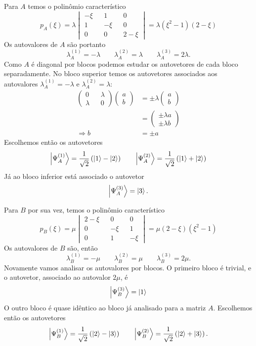 \documentclass[a4paper, 12pt, notitlepage]{article}
\begin{document}
\begin{enumerate}
\begin{enumerate}[(A)]
  Para $A$ temos o polinômio característico
  \[ p_A(\xi) = \lambda\begin{vmatrix}
    -\xi && 1 && 0 \\ 1 && -\xi && 0 \\ 0 && 0 && 2 - \xi
  \end{vmatrix} = \lambda(\xi^2 - 1)(2 - \xi) \]
  Os autovalores de $A$ são portanto 
  \[\lambda_A^{(1)} = -\lambda \qquad \lambda_A^{(2)} = \lambda \qquad \lambda_A^{(3)} = 2\lambda.\]
  Como $A$ é diagonal por blocos podemos estudar os autovetores de cada bloco separadamente. No bloco superior temos os autovetores associados aos autovalores $\lambda_A^{(1)} = -\lambda$ e $\lambda_A^{(2)} = \lambda$:
  \begin{align*}
  \begin{pmatrix}0 && \lambda \\ \lambda && 0 \end{pmatrix}
  \begin{pmatrix}a \\ b \end{pmatrix} &= \pm \lambda \begin{pmatrix} a \\ b \end{pmatrix} \\
  &= \begin{pmatrix}
  \pm\lambda a \\ \pm\lambda b
  \end{pmatrix} \\
  \Rightarrow b &= \pm a
  \end{align*}
  Escolhemos então os autovetores
  \[ \ket{\Psi_A^{(1)}} = \frac{1}{\sqrt{2}}\left(\ket{1} - \ket{2}\right) \qquad \ket{\Psi_A^{(2)}} = \frac{1}{\sqrt{2}}\left(\ket{1} + \ket{2}\right) \]
  Já ao bloco inferior está associado o autovetor
  \[ \ket{\Psi_A^{(3)}} = \ket{3}. \]
  
  Para $B$ por sua vez, temos o polinômio característico
  \[
  p_B(\xi) = \mu\begin{vmatrix}
  2 - \xi && 0 && 0 \\
  0 && -\xi && 1 \\
  0 && 1 && -\xi
  \end{vmatrix} = \mu(2-\xi)(\xi^2 - 1)
  \]
  Os autovalores de $B$ são, então
  \[ \lambda_B^{(1)} = -\mu \qquad \lambda_B^{(2)} = \mu \qquad \lambda_B^{(3)} = 2\mu. \]
  Novamente vamos analisar os autovalores por blocos. O primeiro bloco é trivial, e o autovetor, associado ao autovalor $2\mu$, é
  \[ \ket{\Psi_B^{(3)}} = \ket{1} \]
  O outro bloco é quase idêntico ao bloco já analisado para a matriz $A$. Escolhemos então os autovetores
  \[ \ket{\Psi_B^{(1)}} = \frac{1}{\sqrt{2}}\left(\ket{2} - \ket{3}\right) \qquad \ket{\Psi_B^{(2)}} = \frac{1}{\sqrt{2}}\left(\ket{2} + \ket{3}\right). \]
  

\end{enumerate}
\end{enumerate}
\end{document}
